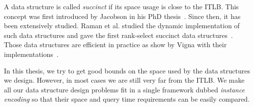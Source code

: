 A data structure is called \emph{succinct} if its space usage is close to the ITLB.
%
This concept was first introduced by Jacobson in his PhD thesis~\cite{Ja88}.
%
Since then, it has been extensively studied.
%
Raman et al. studied the dynamic implementation of such data
structures and gave the first rank-select succinct
data structures~\cite{RRS01,RRS07}.
%
%
Those data structures are efficient in practice as show by Vigna with
their implementations~\cite{Vi08}.

In this thesis, we try to get good bounds on the space used by the data
structures we design. However, in most cases we are still very far from the
ITLB. We make all our data structure design problems fit in a single framework
dubbed \emph{instance encoding} so that their space and query time
requirements can be easily compared.
%



